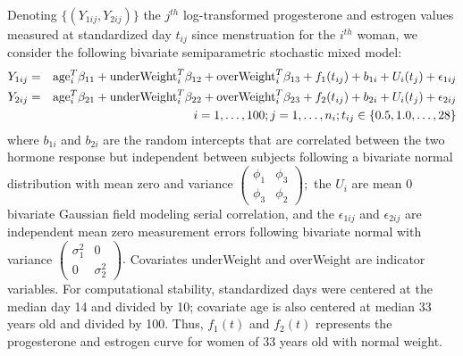 \documentclass[12pt, notitlepage]{article}
\begin{document}
Denoting $\{(Y_{1ij}, Y_{2ij})\}$ the $j^{th}$ log-transformed progesterone and estrogen values measured at standardized day $t_{ij}$ since menstruation for the $i^{th}$ woman, we consider the following bivariate semiparametric stochastic mixed model:
\begin{eqnarray*}
Y_{1ij} &=& {\rm age}_i^T  \beta_{11}  + {\rm underWeight}_i^T  \beta_{12}
+ {\rm overWeight}_i^T  \beta_{13}
+ f_1(t_{ij}) + b_{1i} + U_i(t_j) + \epsilon_{1ij} 
 \\
Y_{2ij} &=& {\rm age}_i^T  \beta_{21} +  {\rm underWeight}_i^T  \beta_{22}
+  {\rm overWeight}_i^T  \beta_{23}
+ f_2(t_{ij}) + b_{2i} + U_i(t_j) + \epsilon_{2ij} 
\\
&& i = 1, \dots, 100; j  = 1, \dots, n_i; t_{ij} \in \{0.5, 1.0, \dots, 28\}
\end{eqnarray*}
where $b_{1i}$ and $b_{2i}$ are the random intercepts that are correlated between the two hormone response but independent between subjects following a bivariate normal distribution with mean zero and variance 
$
\begin{pmatrix}
\phi_{1} &   \phi_{3}  \\
\phi_{3} &   \phi_{2} 
\end{pmatrix};
$
the $U_i$ are mean $0$ bivariate Gaussian field modeling serial correlation, and the $ \epsilon_{1ij} $ and $ \epsilon_{2ij}$ are independent mean zero measurement errors following bivariate normal with variance  
$
  \begin{pmatrix}
 \sigma_1^2 & 0  \\
0 &   \sigma_2^2 
 \end{pmatrix}.
$
Covariates underWeight and overWeight are indicator variables. 
For computational stability, standardized days were centered at the median day 14 and divided by 10; covariate age is also centered at median 33 years old and divided by 100. Thus, $f_1(t)$ and $f_2(t)$ represents the progesterone and estrogen curve for women of 33 years old with normal weight. 
\end{document}
